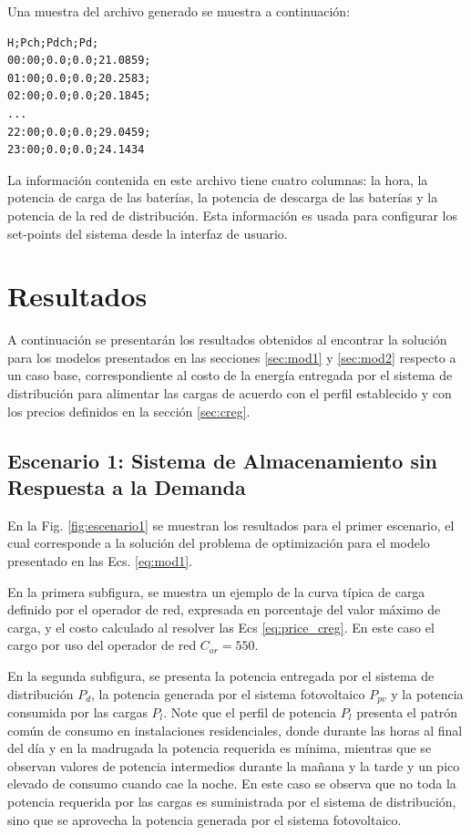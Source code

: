 Una muestra del archivo generado se muestra a continuación:
\begin{verbatim}
H;Pch;Pdch;Pd;
00:00;0.0;0.0;21.0859;
01:00;0.0;0.0;20.2583;
02:00;0.0;0.0;20.1845;
...
22:00;0.0;0.0;29.0459;
23:00;0.0;0.0;24.1434
\end{verbatim}

La información contenida en este archivo tiene cuatro columnas: la hora, la potencia de carga de las baterías, la potencia de descarga de las baterías y la potencia de la red de distribución. Esta información es usada para configurar los set-points del sistema desde la interfaz de usuario.

\section{Resultados}\label{sec:resultados}
A continuación se presentarán los resultados obtenidos al encontrar la solución para los modelos presentados en las secciones \ref{sec:mod1} y \ref{sec:mod2} respecto a un caso base, correspondiente al costo de la energía entregada por el sistema de distribución para alimentar las cargas de acuerdo con el perfil establecido y con los precios definidos en la sección \ref{sec:creg}.

\subsection{Escenario 1: Sistema de Almacenamiento sin Respuesta a la Demanda}\label{sec:escenario1}
En la Fig. \ref{fig:escenario1} se muestran los resultados para el primer escenario, el cual corresponde a la solución del problema de optimización para el modelo presentado en las Ecs. \eqref{eq:mod1}.

En la primera subfigura, se muestra un ejemplo de la curva típica de carga definido por el operador de red, expresada en porcentaje del valor máximo de carga, y el costo calculado al resolver las Ecs \eqref{eq:price_creg}. En este caso el cargo por uso del operador de red $C_{or} = 550$.

En la segunda subfigura, se presenta la potencia entregada por el sistema de distribución $P_d$, la potencia generada por el sistema fotovoltaico $P_{pv}$ y la potencia consumida por las cargas $P_l$. Note que el perfil de potencia $P_l$ presenta el patrón común de consumo en instalaciones residenciales, donde durante las horas al final del día y en la madrugada la potencia requerida es mínima, mientras que se observan valores de potencia intermedios durante la mañana y la tarde y un pico elevado de consumo cuando cae la noche.
En este caso se observa que no toda la potencia requerida por las cargas es suministrada por el sistema de distribución, sino que se aprovecha la potencia generada por el sistema fotovoltaico.

